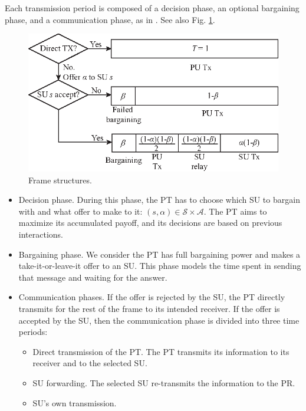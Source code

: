 Each transmission period is composed of a decision phase, an optional bargaining phase, and a communication phase, as in \cite{ref:Simeone2008,ref:Yan2013}. See also Fig. \ref{fig:phase}. 

\begin{figure}[!t]
\centering
\includegraphics{phase.eps}
\caption{Frame structures.}
\label{fig:phase}
\end{figure}

\begin{itemize}
\item Decision phase. During this phase, the PT has to choose which SU to bargain with and what offer to make to it: $(s,\alpha)\in\mathcal{S}\times\mathcal{A}$. The PT aims to maximize its accumulated payoff, and its decisions are based on previous interactions.
\item Bargaining phase. We consider the PT has full bargaining power and makes a take-it-or-leave-it offer to an SU. This phase models the time spent in sending that message and waiting for the answer. 
\item Communication phases. If the offer is rejected by the SU, the PT directly transmits for the rest of the frame to its intended receiver. 
If the offer is accepted by the SU, then the communication phase is divided into three time periods: 
\begin{itemize}
\item Direct transmission of the PT. The PT transmits its information to its receiver and to the selected SU.
\item SU forwarding. The selected SU re-transmits the information to the PR.
\item SU's own transmission.
\end{itemize}
\end{itemize}

